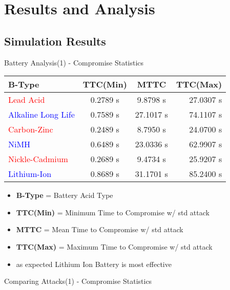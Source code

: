 \documentclass{beamer}
\begin{document}
\section{Results and Analysis}

\subsection{Simulation Results}

	\begin{frame}{Battery Analysis(1) - Compromise Statistics}
	\centering
		\begin{tabular}{| l | c | c | r |}
			\hline
			\textbf{B-Type} & \textbf{TTC(Min)}& \textbf{MTTC} & \textbf{TTC(Max)} \\
			\hline
			\hline
			\textcolor{red}{Lead Acid} & 0.2789 s & 9.8798 s & 27.0307 s \\
			\hline
			\textcolor{blue}{Alkaline Long Life} & 0.7589 s & 27.1017 s & 74.1107 s \\
			\hline
			\textcolor{red}{Carbon-Zinc} &  0.2489 s & 8.7950 s & 24.0700 s \\
			\hline
			\textcolor{blue}{NiMH} & 0.6489 s & 23.0336 s & 62.9907 s \\
			\hline
			\textcolor{red}{Nickle-Cadmium} & 0.2689 s & 9.4734 s & 25.9207 s \\
			\hline
			\textcolor{blue}{Lithium-Ion} & 0.8689 s & 31.1701 s & 85.2400 s \\
			\hline
		\end{tabular}
		\begin{itemize}
			\item \textbf{B-Type} = Battery Acid Type
			\item \textbf{TTC(Min)} = Minimum Time to Compromise w/ std attack
			\item \textbf{MTTC} = Mean Time to Compromise w/ std attack
			\item \textbf{TTC(Max)} = Maximum Time to Compromise w/ std attack
			\item as expected Lithium Ion Battery is most effective
		\end{itemize}
	\end{frame}
	
\begin{frame}{Comparing Attacks(1) - Compromise Statistics}

\end{frame}
\end{document}
